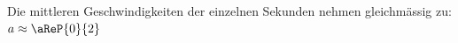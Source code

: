 Die mittleren Geschwindigkeiten der einzelnen Sekunden nehmen gleichmässig zu: $a \approx \aReP{0}{2}$
